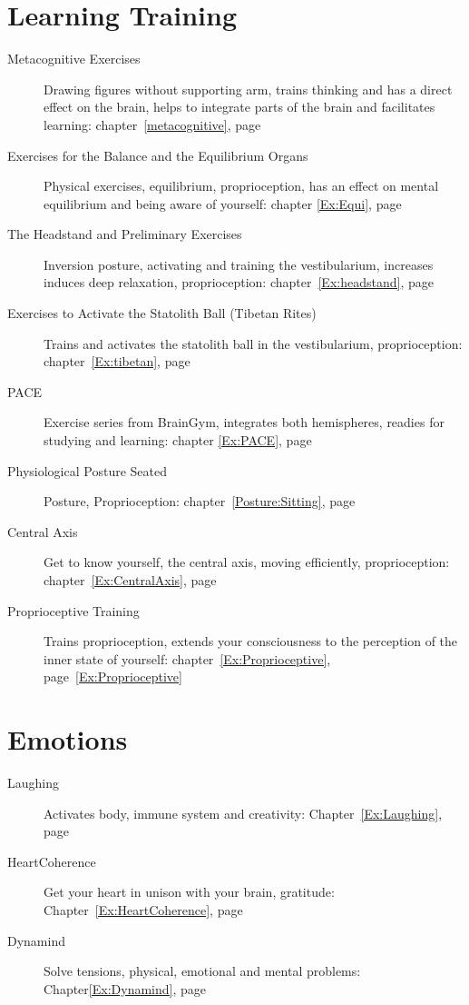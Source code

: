 \documentclass[../main.tex]{subfiles}
\begin{document}
\section{Learning Training}
\begin{description} 
\item[Metacognitive Exercises] Drawing figures without supporting arm, trains thinking and has a direct effect on the brain, helps to integrate parts of the brain and facilitates learning: chapter~\ref{metacognitive}, page~\pageref{metacognitive} %
\item[Exercises for the Balance and the Equilibrium Organs] Physical exercises, equilibrium, proprioception, has an effect on mental equilibrium and being aware of yourself: chapter \ref{Ex:Equi}, page~\pageref{Ex:Equi} %
\item[The Headstand and Preliminary Exercises] Inversion posture, activating and training the vestibularium, increases induces deep relaxation, proprioception: chapter~\ref{Ex:headstand}, page~\pageref{Ex:headstand} %
\item[Exercises to Activate the Statolith Ball (Tibetan Rites)] Trains and activates the statolith ball in the vestibularium, proprioception:
  chapter~\ref{Ex:tibetan}, page~\pageref{Ex:tibetan} %
\item[PACE] Exercise series from BrainGym, integrates both hemispheres, readies for studying and learning: chapter \ref{Ex:PACE}, page \pageref{Ex:PACE} %
\item[Physiological Posture Seated] Posture, Proprioception: chapter~\ref{Posture:Sitting}, page~\pageref{Posture:Sitting} %
\item[Central Axis] Get to know yourself, the central axis, moving efficiently, proprioception: chapter~\ref{Ex:CentralAxis}, page~\pageref{Ex:CentralAxis}
\item[Proprioceptive Training] Trains proprioception, extends your consciousness to the perception of the inner state of yourself: chapter~\ref{Ex:Proprioceptive}, page~\ref{Ex:Proprioceptive} %
\end{description}

\section{Emotions}
\begin{description}
  \item[Laughing] Activates body, immune system and creativity: Chapter~\ref{Ex:Laughing}, page ~\pageref{Ex:Laughing} %
\item[HeartCoherence] Get your heart in unison with your brain, gratitude: Chapter~\ref{Ex:HeartCoherence}, page~\pageref{Ex:HeartCoherence} %
  \item[Dynamind] Solve tensions, physical, emotional and mental problems: Chapter\ref{Ex:Dynamind}, page ~\pageref{Ex:Dynamind} %
\end{description}
\end{document}
